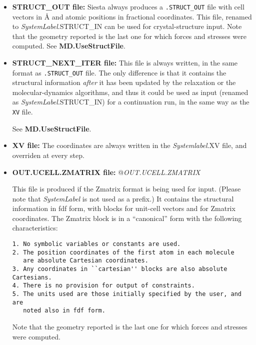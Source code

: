 \documentclass[11pt]{article}
\begin{document}
\begin{itemize}

\item{\bf STRUCT\_OUT file:}
Siesta always produces a {\tt .STRUCT\_OUT} file with cell vectors in {\AA}
and atomic positions in fractional coordinates. This file, renamed to
{\it SystemLabel}.STRUCT\_IN can be used for crystal-structure input.
Note that the geometry reported is the last one for which forces and
stresses were computed.
See {\bf MD.UseStructFile}.

\item{\bf STRUCT\_NEXT\_ITER file:}
This file is always written, in the same format as {\tt .STRUCT\_OUT}
file. The only difference is that it contains the structural
information {\em after} it has been updated by the relaxation or the
molecular-dynamics
algorithms, and thus it could be used as input (renamed as
{\it SystemLabel}.STRUCT\_IN) for a continuation run, in the same way
as the {\tt XV} file.

See {\bf MD.UseStructFile}.

\item{\bf XV file:} The coordinates are always written in the {\it
  Systemlabel}.XV file, and overriden at every step.

\item{\bf OUT.UCELL.ZMATRIX file:}
@{{\it OUT.UCELL.ZMATRIX}}

This file is produced if the Zmatrix format is being used for
input. (Please note that {\it SystemLabel} is not used as a prefix.)
It contains the structural information in fdf form, with
blocks for unit-cell vectors and for Zmatrix coordinates. The
Zmatrix block is in a ``canonical'' form with the following
characteristics:

\begin{verbatim}
1. No symbolic variables or constants are used.
2. The position coordinates of the first atom in each molecule
   are absolute Cartesian coordinates.
3. Any coordinates in ``cartesian'' blocks are also absolute Cartesians.
4. There is no provision for output of constraints.
5. The units used are those initially specified by the user, and are
   noted also in fdf form.
\end{verbatim}

Note that the geometry reported is the last one for which forces and
stresses were computed.


\end{itemize}
\end{document}
